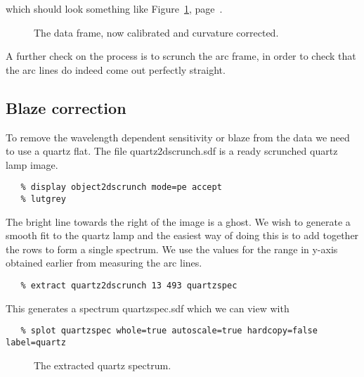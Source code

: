 \documentclass[twoside,11pt]{article}
\newcommand{\scspec}[2]{#1}
\newcommand{\scspec}[2]{#2}
\begin{document}
which should look something like \scspec{Figure~\ref{scrunched},
page~\pageref{scrunched}.}{the figure below.}

\begin{figure}
\begin{center}
  \scspec{\leavevmode\epsfysize=105mm\epsfbox{sc7_19.eps}}
         {\leavevmode\epsfysize=136mm}

  \parbox{140mm}{
    \caption{The data frame, now calibrated and curvature corrected.}
    \label{scrunched}
  }
\end{center}
\end{figure}


A further check on the process is to scrunch the arc frame, in order
to check that the arc lines do indeed come out perfectly straight.


\subsection{Blaze correction}

To remove the wavelength dependent sensitivity or blaze from the data
we need to use a quartz flat. The file quartz2dscrunch.sdf is a ready
scrunched quartz lamp image.

{\scspec{\small}{ }
\begin{verbatim}
   % display object2dscrunch mode=pe accept
   % lutgrey 
\end{verbatim}
}

The bright line towards the right of the image is a ghost. We wish to
generate a smooth fit to the quartz lamp and the easiest way of doing
this is to add together the rows to form a single spectrum. We use the
values for the range in y-axis obtained earlier from measuring the arc
lines.

{\scspec{\small}{ }
\begin{verbatim}
   % extract quartz2dscrunch 13 493 quartzspec 
\end{verbatim}
}

This generates a spectrum quartzspec.sdf which we can view with 

{\scspec{\small}{ }
\begin{verbatim}
   % splot quartzspec whole=true autoscale=true hardcopy=false label=quartz
\end{verbatim}
}

\begin{figure}
\begin{center}
  \scspec{\leavevmode\epsfysize=105mm\epsfbox{sc7_20.eps}}
          {\leavevmode\epsfysize=136mm}

  \parbox{140mm}{
    \caption{The extracted quartz spectrum.}
    \label{quartzfit}
  }
\end{center}
\end{figure}
\end{document}

